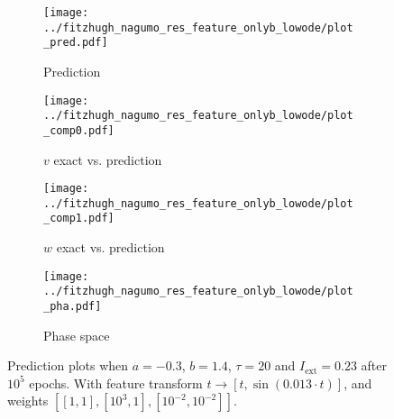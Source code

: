 \documentclass[a4paper]{article}
\begin{document}
\begin{figure}[H]
	\centering 
	\begin{subfigure}[b]{0.47\textwidth}
		\centering
		\texttt{[image: ../fitzhugh\_nagumo\_res\_feature\_onlyb\_lowode/plot\_pred.pdf]}
		\caption{Prediction}
		\label{fig:justb00a}
	\end{subfigure}
	\begin{subfigure}[b]{0.47\textwidth}
		\centering
		\texttt{[image: ../fitzhugh\_nagumo\_res\_feature\_onlyb\_lowode/plot\_comp0.pdf]}
		\caption{$v$ exact vs. prediction}
		\label{fig:justb00b}
	\end{subfigure}
	\begin{subfigure}[b]{0.47\textwidth}
		\centering
		\texttt{[image: ../fitzhugh\_nagumo\_res\_feature\_onlyb\_lowode/plot\_comp1.pdf]}
		\caption{$w$ exact vs. prediction}
		\label{fig:justb00c}
	\end{subfigure}
	\begin{subfigure}[b]{0.47\textwidth}
		\centering
		\texttt{[image: ../fitzhugh\_nagumo\_res\_feature\_onlyb\_lowode/plot\_pha.pdf]}
		\caption{Phase space}
		\label{fig:justb00d}
	\end{subfigure}
	\caption{Prediction plots when $a=-0.3$, $b=1.4$, $\tau=20$ and $ I_{\text{ext}}=0.23$ after $10^5$ epochs. With feature transform $t \rightarrow \left[ t, \sin(0.013\cdot t) \right] $, and weights $\left[ \left[ 1, 1\right], \left[ 10^3, 1\right], \left[ 10^{-2}, 10^{-2}\right]\right]$.}
	\label{plot:justb00}
\end{figure} 	
\end{document}
